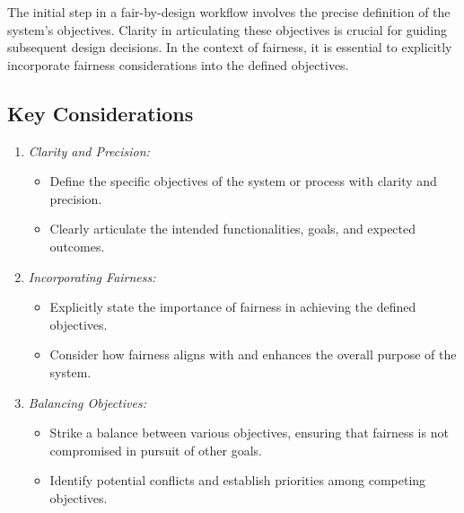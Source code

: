 \documentclass[12pt,a4paper,openright,twoside]{book}
\begin{document}
The initial step in a fair-by-design workflow involves the precise definition of the system's objectives. Clarity in articulating these objectives is crucial for guiding subsequent design decisions. In the context of fairness, it is essential to explicitly incorporate fairness considerations into the defined objectives.

\subsection{Key Considerations}

\begin{enumerate}

    \item \emph{Clarity and Precision:}

        \begin{itemize}

            \item Define the specific objectives of the system or process with clarity and precision.
            
            \item Clearly articulate the intended functionalities, goals, and expected outcomes.
        
        \end{itemize}
    
    \item \emph{Incorporating Fairness:}

        \begin{itemize}
            
            \item Explicitly state the importance of fairness in achieving the defined objectives.
            
            \item Consider how fairness aligns with and enhances the overall purpose of the system.
        
        \end{itemize}
    
    \item \emph{Balancing Objectives:}

        \begin{itemize}
            
            \item Strike a balance between various objectives, ensuring that fairness is not compromised in pursuit of other goals.
            
            \item Identify potential conflicts and establish priorities among competing objectives.
        
        \end{itemize}

\end{enumerate}
\end{document}
